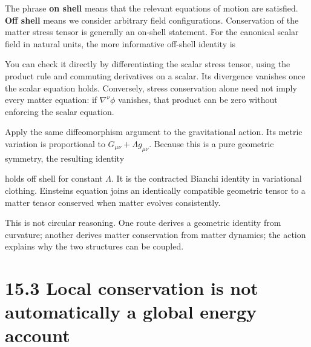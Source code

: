 \documentclass[
  11pt,
  letterpaper,
  oneside,
  openany]{scrbook}
\begin{document}
The phrase \textbf{on shell} means that the relevant equations of motion
are satisfied. \textbf{Off shell} means we consider arbitrary field
configurations. Conservation of the matter stress tensor is generally an
on-shell statement. For the canonical scalar field in natural units, the
more informative off-shell identity is

\begin{center}
\begingroup
{}
\ifdim\wd\grmathbox>\linewidth
\resizebox{\linewidth}{!}{\usebox{\grmathbox}}
\else\usebox{\grmathbox}\fi
\endgroup
\end{center}

You can check it directly by differentiating the scalar stress tensor,
using the product rule and commuting derivatives on a scalar. Its
divergence vanishes once the scalar equation holds. Conversely, stress
conservation alone need not imply every matter equation: if
\(\nabla^\nu\phi\) vanishes, that product can be zero without enforcing
the scalar equation.

Apply the same diffeomorphism argument to the gravitational action. Its
metric variation is proportional to \(G_{\mu\nu}+\Lambda g_{\mu\nu}\).
Because this is a pure geometric symmetry, the resulting identity

\begin{center}
\begingroup
{}
\ifdim\wd\grmathbox>\linewidth
\resizebox{\linewidth}{!}{\usebox{\grmathbox}}
\else\usebox{\grmathbox}\fi
\endgroup
\end{center}

holds off shell for constant \(\Lambda\). It is the contracted Bianchi
identity in variational clothing. Einstein\textquotesingle s equation
joins an identically compatible geometric tensor to a matter tensor
conserved when matter evolves consistently.

This is not circular reasoning. One route derives a geometric identity
from curvature; another derives matter conservation from matter
dynamics; the action explains why the two structures can be coupled.

\hypertarget{local-conservation-is-not-automatically-a-global-energy-account}{%
\section{15.3 Local conservation is not automatically a global energy
account}\label{local-conservation-is-not-automatically-a-global-energy-account}}
\end{document}
